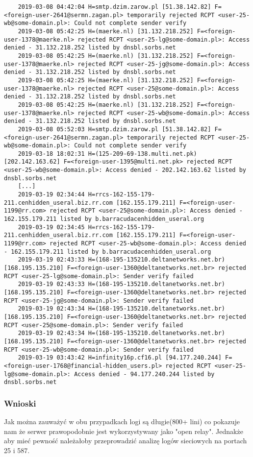 \documentclass{article}
\begin{document}
\begin{verbatim}
    2019-03-08 04:42:04 H=smtp.dzim.zarow.pl [51.38.142.82] F=<foreign-user-2641@sermn.zagan.pl> temporarily rejected RCPT <user-25-wb@some-domain.pl>: Could not complete sender verify
    2019-03-08 05:42:25 H=(maerke.nl) [31.132.218.252] F=<foreign-user-1378@maerke.nl> rejected RCPT <user-25-lg@some-domain.pl>: Access denied - 31.132.218.252 listed by dnsbl.sorbs.net
    2019-03-08 05:42:25 H=(maerke.nl) [31.132.218.252] F=<foreign-user-1378@maerke.nl> rejected RCPT <user-25-jg@some-domain.pl>: Access denied - 31.132.218.252 listed by dnsbl.sorbs.net
    2019-03-08 05:42:25 H=(maerke.nl) [31.132.218.252] F=<foreign-user-1378@maerke.nl> rejected RCPT <user-25@some-domain.pl>: Access denied - 31.132.218.252 listed by dnsbl.sorbs.net
    2019-03-08 05:42:25 H=(maerke.nl) [31.132.218.252] F=<foreign-user-1378@maerke.nl> rejected RCPT <user-25-wb@some-domain.pl>: Access denied - 31.132.218.252 listed by dnsbl.sorbs.net
    2019-03-08 05:52:03 H=smtp.dzim.zarow.pl [51.38.142.82] F=<foreign-user-2641@sermn.zagan.pl> temporarily rejected RCPT <user-25-wb@some-domain.pl>: Could not complete sender verify
    2019-03-18 18:02:31 H=(125-209-69-138.multi.net.pk) [202.142.163.62] F=<foreign-user-1395@multi.net.pk> rejected RCPT <user-25-wb@some-domain.pl>: Access denied - 202.142.163.62 listed by dnsbl.sorbs.net
    [...]
    2019-03-19 02:34:44 H=rrcs-162-155-179-211.cenhidden_useral.biz.rr.com [162.155.179.211] F=<foreign-user-1199@rr.com> rejected RCPT <user-25@some-domain.pl>: Access denied - 162.155.179.211 listed by b.barracudacenhidden_useral.org
    2019-03-19 02:34:45 H=rrcs-162-155-179-211.cenhidden_useral.biz.rr.com [162.155.179.211] F=<foreign-user-1199@rr.com> rejected RCPT <user-25-wb@some-domain.pl>: Access denied - 162.155.179.211 listed by b.barracudacenhidden_useral.org
    2019-03-19 02:43:33 H=(168-195-135210.deltanetworks.net.br) [168.195.135.210] F=<foreign-user-1360@deltanetworks.net.br> rejected RCPT <user-25-lg@some-domain.pl>: Sender verify failed
    2019-03-19 02:43:33 H=(168-195-135210.deltanetworks.net.br) [168.195.135.210] F=<foreign-user-1360@deltanetworks.net.br> rejected RCPT <user-25-jg@some-domain.pl>: Sender verify failed
    2019-03-19 02:43:34 H=(168-195-135210.deltanetworks.net.br) [168.195.135.210] F=<foreign-user-1360@deltanetworks.net.br> rejected RCPT <user-25@some-domain.pl>: Sender verify failed
    2019-03-19 02:43:34 H=(168-195-135210.deltanetworks.net.br) [168.195.135.210] F=<foreign-user-1360@deltanetworks.net.br> rejected RCPT <user-25-wb@some-domain.pl>: Sender verify failed
    2019-03-19 03:43:42 H=infinity16p.cf16.pl [94.177.240.244] F=<foreign-user-1768@financial-hidden_users.pl> rejected RCPT <user-25-lg@some-domain.pl>: Access denied - 94.177.240.244 listed by dnsbl.sorbs.net
\end{verbatim}
\subsubsection{Wnioski}
Jak można zauważyć w obu przypadkach logi są długie(800+ lini) co pokazuje nam że serwer prawopodobnie 
jest wykorzystywany jako "open relay". 
Jednakże aby mieć pewność należałoby przeprowadzić analizę logów sieciowych na portach 25 i 587.
\end{document}
